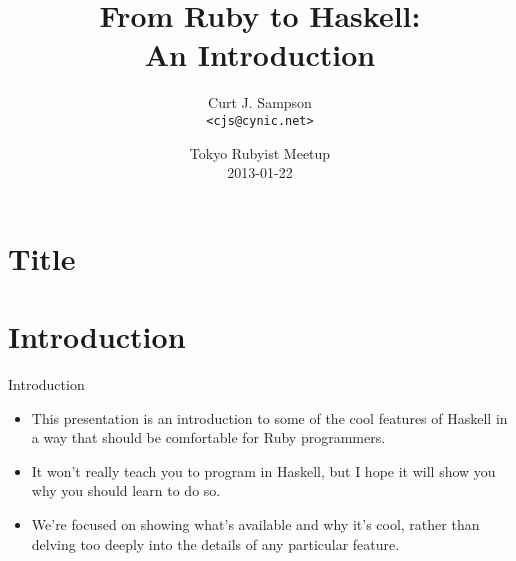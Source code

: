 \documentclass[xcolor=dvipsnames]{beamer}          %
\title[From Ruby to Haskell]{From Ruby to Haskell:\\An Introduction}
\author{Curt J. Sampson \\ \texttt{<cjs@cynic.net>}}
\date[TRM 2013-01-22]{Tokyo Rubyist Meetup \\ 2013-01-22}
\begin{document}
\section{Title}

\begin{frame}
  \titlepage
\end{frame}


\section{Introduction}

\begin{frame}[fragile]{Introduction}
\begin{itemize}
    \item This presentation is an introduction to some of the cool
        features of Haskell in a way that should be comfortable
        for Ruby programmers.
    \item It won't really teach you to program in Haskell, but I hope
        it will show you why you should learn to do so.
    \item We're focused on showing what's available and why it's
        cool, rather than delving too deeply into the details of any
        particular feature.
\end{itemize}
\end{frame}
\end{document}
